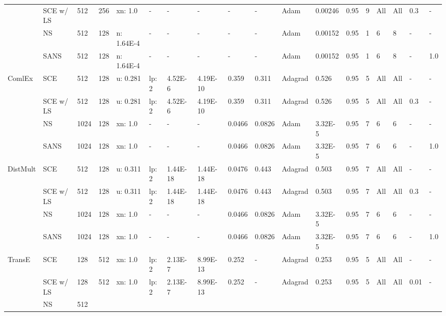 \begin{table}[h!]
{\begin{tabular}{llllllllllllllllll}
 &
  SCE w/ LS &
  512 &
  256 &
  xn: 1.0 &
  - &
  - &
  - &
  - &
  - &
  Adam &
  0.00246 &
  0.95 &
  9 &
  All &
  All &
  0.3 &
  - \\
 &
  NS &
  512 &
  128 &
  n: 1.64E-4 &
  - &
  - &
  - &
  - &
  - &
  Adam &
  0.00152 &
  0.95 &
  1 &
  6 &
  8 &
  - &
  - \\
 &
  SANS &
  512 &
  128 &
  n: 1.64E-4 &
  - &
  - &
  - &
  - &
  - &
  Adam &
  0.00152 &
  0.95 &
  1 &
  6 &
  8 &
  - &
  1.0 \\
  \midrule
\multirow{4}{*}{ComlEx} &
  SCE &
  512 &
  128 &
  u: 0.281 &
  lp: 2 &
  4.52E-6 &
  4.19E-10 &
  0.359 &
  0.311 &
  Adagrad &
  0.526 &
  0.95 &
  5 &
  All &
  All &
  - &
  - \\
 &
  SCE w/ LS &
  512 &
  128 &
  u: 0.281 &
  lp: 2 &
  4.52E-6 &
  4.19E-10 &
  0.359 &
  0.311 &
  Adagrad &
  0.526 &
  0.95 &
  5 &
  All &
  All &
  0.3 &
  - \\
 &
  NS &
  1024 &
  128 &
  xn: 1.0 &
  - &
  - &
  - &
  0.0466 &
  0.0826 &
  Adam &
  3.32E-5 &
  0.95 &
  7 &
  6 &
  6 &
  - &
  - \\
 &
  SANS &
  1024 &
  128 &
  xn: 1.0 &
  - &
  - &
  - &
  0.0466 &
  0.0826 &
  Adam &
  3.32E-5 &
  0.95 &
  7 &
  6 &
  6 &
  - &
  1.0 \\
  \midrule
\multirow{4}{*}{DistMult} &
  SCE &
  512 &
  128 &
  u: 0.311 &
  lp: 2 &
  1.44E-18 &
  1.44E-18 &
  0.0476 &
  0.443 &
  Adagrad &
  0.503 &
  0.95 &
  7 &
  All &
  All &
  - &
  - \\
 &
  SCE w/ LS &
  512 &
  128 &
  u: 0.311 &
  lp: 2 &
  1.44E-18 &
  1.44E-18 &
  0.0476 &
  0.443 &
  Adagrad &
  0.503 &
  0.95 &
  7 &
  All &
  All &
  0.3 &
  - \\
 &
  NS &
  1024 &
  128 &
  xn: 1.0 &
  - &
  - &
  - &
  0.0466 &
  0.0826 &
  Adam &
  3.32E-5 &
  0.95 &
  7 &
  6 &
  6 &
  - &
  - \\
 &
  SANS &
  1024 &
  128 &
  xn: 1.0 &
  - &
  - &
  - &
  0.0466 &
  0.0826 &
  Adam &
  3.32E-5 &
  0.95 &
  7 &
  6 &
  6 &
  - &
  1.0 \\
  \midrule
\multirow{4}{*}{TransE} &
  SCE &
  128 &
  512 &
  xn: 1.0 &
  lp: 2 &
  2.13E-7 &
  8.99E-13 &
  0.252 &
  - &
  Adagrad &
  0.253 &
  0.95 &
  5 &
  All &
  All &
  - &
  - \\
 &
  SCE w/ LS &
  128 &
  512 &
  xn: 1.0 &
  lp: 2 &
  2.13E-7 &
  8.99E-13 &
  0.252 &
  - &
  Adagrad &
  0.253 &
  0.95 &
  5 &
  All &
  All &
  0.01 &
  - \\
 &
  NS &
  512 &

\end{tabular}}
\end{table}
